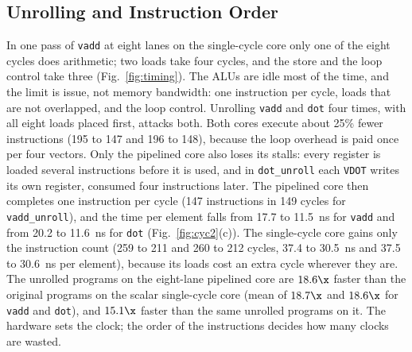 \subsection{Unrolling and Instruction Order}
In one pass of \texttt{vadd} at eight lanes on the single-cycle core only one of the
eight cycles does arithmetic; two loads take four cycles, and the store and the loop
control take three (Fig.~\ref{fig:timing}). The ALUs are idle most of the time, and the
limit is issue, not memory bandwidth: one instruction per cycle, loads that are not
overlapped, and the loop control. Unrolling \texttt{vadd} and \texttt{dot} four times,
with all eight loads placed first, attacks both. Both cores execute about 25\% fewer
instructions (195 to 147 and 196 to 148), because the loop overhead is paid once per four
vectors. Only the pipelined core also loses its stalls: every register is loaded several
instructions before it is used, and in \texttt{dot\_unroll} each \texttt{VDOT} writes its
own register, consumed four instructions later. The pipelined core then completes one
instruction per cycle (147 instructions in 149 cycles for \texttt{vadd\_unroll}), and the
time per element falls from 17.7 to 11.5~ns for \texttt{vadd} and from 20.2 to 11.6~ns
for \texttt{dot} (Fig.~\ref{fig:cyc2}(c)). The single-cycle core gains only the
instruction count (259 to 211 and 260 to 212 cycles, 37.4 to 30.5~ns and 37.5 to
30.6~ns per element), because its loads cost an extra cycle wherever they are. The
unrolled programs on the eight-lane pipelined core are $18.6\x$ faster than the original
programs on the scalar single-cycle core (mean of $18.7\x$ and $18.6\x$ for \texttt{vadd}
and \texttt{dot}), and $15.1\x$ faster than the same unrolled programs on it. The
hardware sets the clock; the order of the instructions decides how many clocks are
wasted.

